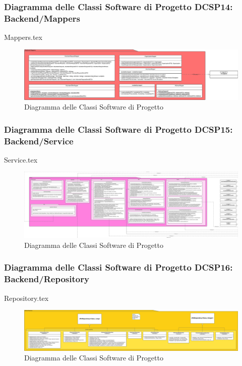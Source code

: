 \documentclass[12pt]{article}
\begin{document}
\subsubsection{Diagramma delle Classi Software di Progetto DCSP14: Backend/Mappers}
{Mappers.tex}

\begin{figure}[H]
    \includegraphics[width=\textwidth, height=\textheight,keepaspectratio]{Immagini/DCSP/Iterazione 2/Backend/DCSPMappers.png}
        \caption{Diagramma delle Classi Software di Progetto}
        \label{fig:diagrammaDCSP14}
\end{figure}

\subsubsection{Diagramma delle Classi Software di Progetto DCSP15: Backend/Service}
{Service.tex}

\begin{figure}[H]
    \includegraphics[width=\textwidth, height=\textheight,keepaspectratio]{Immagini/DCSP/Iterazione 2/Backend/DCSPService.png}
        \caption{Diagramma delle Classi Software di Progetto}
        \label{fig:diagrammaDCSP15}
\end{figure}

\subsubsection{Diagramma delle Classi Software di Progetto DCSP16: Backend/Repository}
{Repository.tex}

\begin{figure}[H]
    \includegraphics[width=\textwidth, height=\textheight,keepaspectratio]{Immagini/DCSP/Iterazione 2/Backend/DCSPRepository.png}
        \caption{Diagramma delle Classi Software di Progetto}
        \label{fig:diagrammaDCSP16}
\end{figure}
\end{document}
